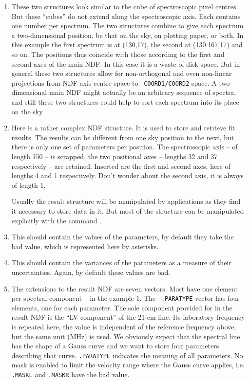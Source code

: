 \begin{enumerate}
\item These two structures look similar to the cube of spectroscopic
   pixel centres. But these ``cubes'' do not extend along the
   spectroscopic axis. Each contains one number per spectrum. The two
   structures combine to give each spectrum a two-dimensional position,
   be that on the sky, on plotting paper, or both. In this example the
   first spectrum is at (130,17), the second at (130.167,17) and so
   on. The positions thus coincide with those according to the first and
   second axes of the main NDF. In this case it is a waste of disk
   space. But in general these two structures allow for non-orthogonal
   and even non-linear projections from NDF axis centre space to {\tt
   COORD1/COORD2} space. A two-dimensional main NDF might actually be an
   arbitrary sequence of spectra, and still these two structures could
   help to sort each spectrum into its place on the sky.

\item Here is a rather complex NDF structure. It is used to store and
   retrieve fit results. The results can be different from one sky
   position to the next, but there is only one set of parameters per
   position. The spectroscopic axis -- of length 150 -- is scrapped, the
   two positional axes -- lengths 32 and 37 respectively -- are
   retained. Inserted are the first and second axes, here of lengths 4
   and 1 respectively. Don't wonder about the second axis, it is always
   of length 1.

   Usually the result structure will be manipulated by applications as
   they find it necessary to store data in it. But most of the structure
   can be manipulated explicitly with the command
{\tt{}}.

\item This should contain the values of the parameters, by default they
   take the bad value, which is represented here by asterisks.

\item This should contain the variances of the parameters as a measure
   of their uncertainties. Again, by default these values are bad.

\item The extensions to the result NDF are seven vectors. Most have one
   element per spectral component -- in the example 1. The {\tt
   .PARATYPE} vector has four elements, one for each parameter. The sole
   component provided for in the result NDF is the ``LV component'' of
   the 21 cm line. Its laboratory frequency is repeated here, the value
   is independent of the reference frequency above, but the same unit
   (MHz) is used. We obviously expect that the spectral line has the
   shape of a Gauss curve and we want to store four parameters
   describing that curve. {\tt .PARATYPE} indicates the meaning of all
   parameters. No mask is enabled to limit the velocity range where the
   Gauss curve applies, i.e. {\tt .MASKL} and {\tt .MASKR} have the bad
   value.


\end{enumerate}
